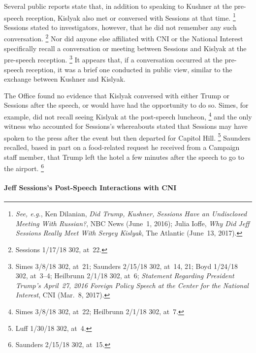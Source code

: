 Several public reports state that, in addition to speaking to Kushner at the pre-speech reception, Kislyak also met or conversed with Sessions at that time.%
\footnote{\textit{See, e.g.}, Ken Dilanian, \textit{Did Trump, Kushner, Sessions Have an Undisclosed Meeting With Russian?}, NBC News (June~1, 2016);
Julia Ioffe, \textit{Why Did Jeff Sessions Really Meet With Sergey Kislyak}, The Atlantic (June~13, 2017).}
Sessions stated to investigators, however, that he did not remember any such conversation.%
\footnote{Sessions 1/17/18 302, at~22.}
Nor did anyone else affiliated with CNI or the National Interest specifically recall a conversation or meeting between Sessions and Kislyak at the pre-speech reception.%
\footnote{Simes 3/8/18 302, at~21;
Saunders 2/15/18 302, at~14, 21;
Boyd 1/24/18 302, at~3--4;
Heilbrunn 2/1/18 302, at~6;
\textit{Statement Regarding President Trump's April~27, 2016 Foreign Policy Speech at the Center for the National Interest}, CNI (Mar.~8, 2017).}
It appears that, if a conversation occurred at the pre-speech reception, it was a brief one conducted in public view, similar to the exchange between Kushner and Kislyak.

The Office found no evidence that Kislyak conversed with either Trump or Sessions after the speech, or would have had the opportunity to do so.
Simes, for example, did not recall seeing Kislyak at the post-speech luncheon,%
\footnote{Simes 3/8/18 302, at~22;
Heilbrunn 2/1/18 302, at~7.}
and the only witness who accounted for Sessions's whereabouts stated that Sessions may have spoken to the press after the event but then departed for Capitol Hill.%
\footnote{Luff 1/30/18 302, at~4.}
Saunders recalled, based in part on a food-related request he received from a Campaign staff member, that Trump left the hotel a few minutes after the speech to go to the airport.%
\footnote{Saunders 2/15/18 302, at~15.}

\paragraph{Jeff Sessions's Post-Speech Interactions with CNI}

